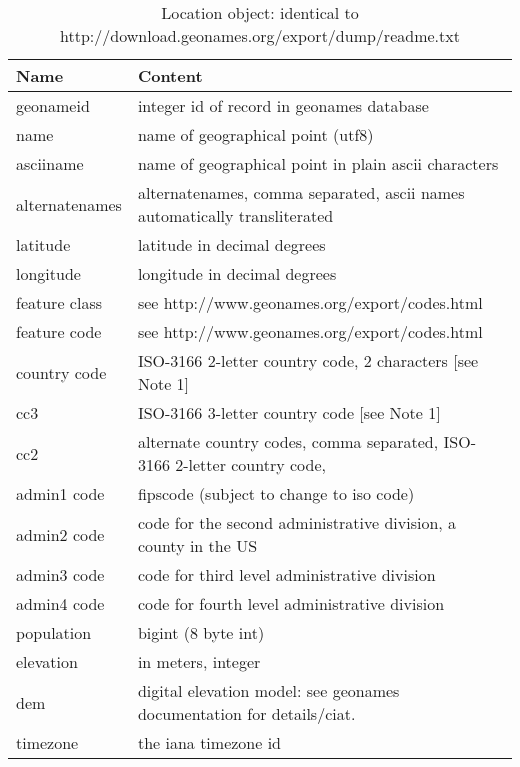 \documentclass[11pt]{report}
\begin{document}
\begin{table}[htp]
\caption{Location object: identical to http://download.geonames.org/export/dump/readme.txt}
\begin{center}
\begin{tabular}{|l|p{10cm}|}
\hline
Name & Content  \\
\hline
geonameid & integer id of record in geonames database \\
name & name of geographical point (utf8)\\
asciiname & name of geographical point in plain ascii characters \\
alternatenames & alternatenames, comma separated, ascii names automatically transliterated \\
latitude & latitude in decimal degrees\\
longitude & longitude in decimal degrees \\
feature class & see http://www.geonames.org/export/codes.html\\
feature code & see http://www.geonames.org/export/codes.html \\
country code & ISO-3166 2-letter country code, 2 characters [see Note 1] \\
cc3 & ISO-3166 3-letter country code [see Note 1] \\
cc2 & alternate country codes, comma separated, ISO-3166 2-letter country code,  \\
admin1 code & fipscode (subject to change to iso code)\\
admin2 code & code for the second administrative division, a county in the US \\
admin3 code & code for third level administrative division \\
admin4 code & code for fourth level administrative division \\
population & bigint (8 byte int)  \\
elevation & in meters, integer \\
dem & digital elevation model: see geonames documentation for details/ciat. \\
timezone & the iana timezone id  \\
\hline
\end{tabular}
\end{center}
\label{tab:locations}


\end{table}
\end{document}
